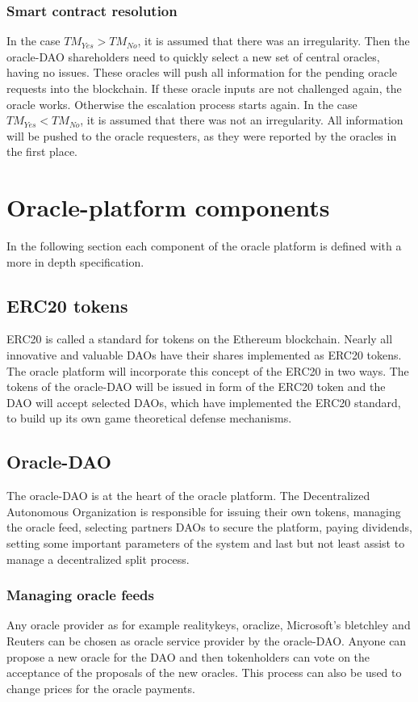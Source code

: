 \documentclass[a4paper]{article}
\begin{document}
\subsubsection{Smart contract resolution}
In the case $TM_{Yes}>TM_{No}$, it is assumed that there was an irregularity. Then the oracle-DAO shareholders need to quickly select  a new set of central oracles, having no issues. These oracles will push all information for the pending oracle requests into the blockchain. If these oracle inputs are not challenged again, the oracle works. Otherwise the escalation process starts again.
In the case $TM_{Yes}<TM_{No}$, it is assumed that there was not an irregularity. All information will be pushed to the oracle requesters, as they were reported by the oracles in the first place.

\section{Oracle-platform components}
In the following section each component of the oracle platform is defined with a more in depth specification. 
\subsection{ERC20 tokens} 
ERC20 is called a standard for tokens on the Ethereum blockchain. Nearly all innovative and valuable DAOs have their shares implemented as ERC20 tokens. The oracle platform will incorporate this concept of the ERC20 in two ways. The tokens of the oracle-DAO will be issued in form of the ERC20 token and the DAO will accept selected DAOs, which have implemented the ERC20 standard, to build up its own game theoretical defense mechanisms.

\subsection{Oracle-DAO}
The oracle-DAO is at the heart of the oracle platform. The Decentralized Autonomous Organization is responsible for issuing their own tokens, managing the oracle feed, selecting partners DAOs to secure the platform, paying dividends, setting some important parameters of the system and last but not least assist to manage a decentralized split process.


\subsubsection{Managing oracle feeds}
Any oracle provider as for example realitykeys, oraclize, Microsoft's bletchley and Reuters can be chosen as oracle service provider by the oracle-DAO. Anyone can propose a new oracle for the DAO and then tokenholders can vote on the acceptance of the proposals of the new oracles. This process can also be used to change prices for the oracle payments.
\end{document}
